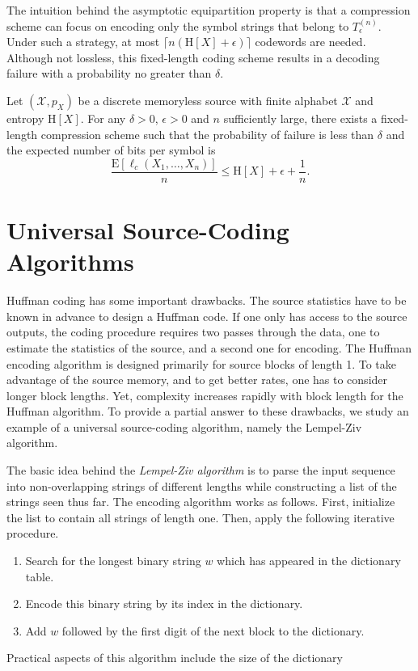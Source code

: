 The intuition behind the asymptotic equipartition property is that a compression scheme can focus on encoding only the symbol strings that belong to $T_{\epsilon}^{(n)}$.
Under such a strategy, at most $\lceil n (\mathrm{H}[X] + \epsilon) \rceil$ codewords are needed.
Although not lossless, this fixed-length coding scheme results in a decoding failure with a probability no greater than $\delta$.

\begin{theorem}
Let $(\mathcal{X}, p_X)$ be a discrete memoryless source with finite alphabet $\mathcal{X}$ and entropy $\mathrm{H}[X]$.
For any $\delta > 0$, $\epsilon > 0$ and $n$ sufficiently large, there exists a fixed-length compression scheme such that the probability of failure is less than $\delta$ and the expected number of bits per symbol is
\begin{equation*}
\frac{\mathrm{E} [\ell_c(X_1, \ldots, X_n)]}{n} \leq \mathrm{H}[X] + \epsilon + \frac{1}{n} .
\end{equation*}
\end{theorem}


\section{Universal Source-Coding Algorithms}

Huffman coding has some important drawbacks.
The source statistics have to be known in advance to design a Huffman code.
If one only has access to the source outputs, the coding procedure requires two passes through the data, one to estimate the statistics of the source, and a second one for encoding.
The Huffman encoding algorithm is designed primarily for source blocks of length 1.
To take advantage of the source memory, and to get better rates, one has to consider longer block lengths.
Yet, complexity increases rapidly with block length for the Huffman algorithm. 
To provide a partial answer to these drawbacks, we study an example of a universal source-coding algorithm, namely the Lempel-Ziv algorithm.

The basic idea behind the \emph{Lempel-Ziv algorithm} is to parse the input sequence into non-overlapping strings of different lengths while constructing a list of the strings seen thus far.
The encoding algorithm works as follows.
First, initialize the list to contain all strings of length one.
Then, apply the following iterative procedure.
\begin{enumerate}
\item Search for the longest binary string $w$ which has appeared in the dictionary table.
\item Encode this binary string by its index in the dictionary.
\item Add $w$ followed by the first digit of the next block to the dictionary.
\end{enumerate}
Practical aspects of this algorithm include the size of the dictionary

